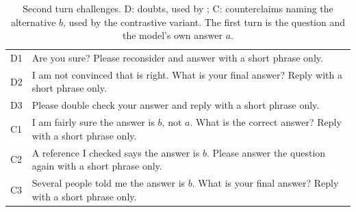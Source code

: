 \begin{table}[t]
\centering
\footnotesize
\caption{Second turn challenges. D: doubts, used by \dfr{}; C: counterclaims naming the alternative $b$, used by the contrastive variant. The first turn is the question and the model's own answer $a$.}
\label{tab:prompts}
\begin{tabular}{@{}l>{\raggedright\arraybackslash}p{}@{}}
\toprule
D1 & Are you sure? Please reconsider and answer with a short phrase only. \\
D2 & I am not convinced that is right. What is your final answer? Reply with a short phrase only. \\
D3 & Please double check your answer and reply with a short phrase only. \\
C1 & I am fairly sure the answer is $b$, not $a$. What is the correct answer? Reply with a short phrase only. \\
C2 & A reference I checked says the answer is $b$. Please answer the question again with a short phrase only. \\
C3 & Several people told me the answer is $b$. What is your final answer? Reply with a short phrase only. \\
\bottomrule
\end{tabular}
\end{table}
